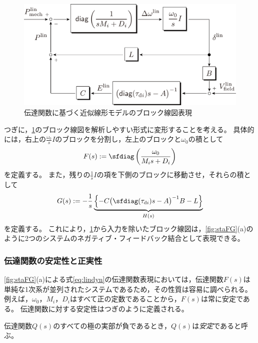 \documentclass[tombow,dvipdfmx]{corona-a5}
\begin{document}
\begin{figure}[t]
\centering
\includegraphics[width = .75\linewidth]{figs/blocklinsys2}
\caption{伝達関数に基づく近似線形モデルのブロック線図表現}
\label{fig:blocklin}
\end{figure}




つぎに，\ref{fig:blocklin}のブロック線図を解析しやすい形式に変形することを考える。
具体的には，右上の$\frac{\omega_0}{s}I$のブロックを分割し，左上のブロックと$\omega_0$の積として
\begin{align}\label{eq:trFs}
F(s) :=  
\sfdiag \left( 
\frac{\omega_0}{M_i s + D_i}
\right)
\end{align}
を定義する。
また，残りの$\frac{1}{s}I$の項を下側のブロックに移動させ，それらの積として
\begin{align}\label{eq:trGs}
G(s) :=  - \frac{1}{s} 
\underbrace{
\left\{ -C \bigl( \sfdiag(\tau_{{\rm d}i})s -A \bigr)^{-1} B - L \right\}
}_{H(s)}
\end{align}
を定義する。
これにより，\ref{fig:blocklin}から入力を除いたブロック線図は，\ref{fig:staFG}(a)のように2つのシステムのネガティブ・フィードバック結合として表現できる。

\subsubsection{伝達関数の安定性と正実性}

\ref{fig:staFG}(a)による式\ref{eq:lindyn}の伝達関数表現においては，伝達関数$F(s)$は単純な1次系が並列されたシステムであるため，その性質は容易に調べられる。
例えば，$\omega_0$，$M_i$，$D_i$はすべて正の定数であることから，$F(s)$は常に安定である。
伝達関数に対する安定性はつぎのように定義される。

\begin{定義}[伝達関数の安定性]\label{def:trsta}
伝達関数$Q(s)$のすべての極の実部が負であるとき，$Q(s)$は\emph{安定}であると呼ぶ。
\end{定義}
\end{document}
